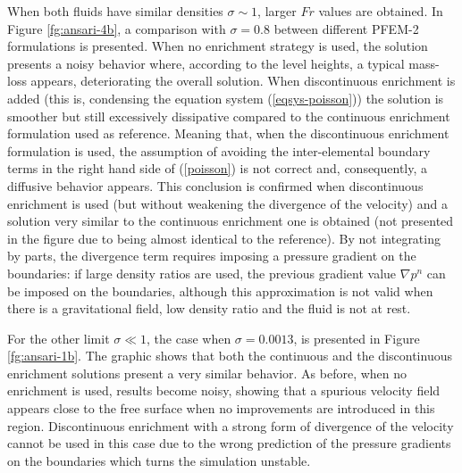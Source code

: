When both fluids have similar densities $\sigma \sim 1$, larger $Fr$ values are obtained. In Figure \ref{fg:ansari-4b}, a comparison with $\sigma=0.8$ between different PFEM-2 formulations is presented. When no enrichment strategy is used, the solution presents a noisy behavior where, according to the level heights, a typical mass-loss appears, deteriorating the overall solution. When discontinuous enrichment is added (this is, condensing the equation system (\ref{eqsys-poisson})) the solution is smoother but still excessively dissipative compared to the continuous enrichment formulation used as reference. Meaning that, when the discontinuous enrichment formulation is used, the assumption of avoiding the inter-elemental boundary terms in the right hand side of (\ref{poisson}) is not correct and, consequently, a diffusive behavior appears. This conclusion is confirmed when discontinuous enrichment is used (but without weakening the divergence of the velocity) and a solution very similar to the continuous enrichment one is obtained (not presented in the figure due to being almost identical to the reference). By not integrating by parts, the divergence term requires imposing a pressure gradient on the boundaries: if large density ratios are used, the previous gradient value $\nabla p^n$ can be imposed on the boundaries, although this approximation is not valid when there is a gravitational field, low density ratio and the fluid is not at rest.


For the other limit $\sigma \ll 1$, the case when $\sigma=0.0013$, is presented in Figure \ref{fg:ansari-1b}. The graphic shows that both the continuous and the discontinuous enrichment solutions present a very similar behavior. As before, when no enrichment is used, results become noisy, showing that a spurious velocity field appears close to the free surface when no improvements are introduced in this region. Discontinuous enrichment with a strong form of divergence of the velocity cannot be used in this case due to the wrong prediction of the pressure gradients on the boundaries which turns the simulation unstable.

